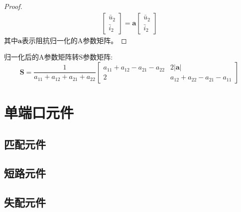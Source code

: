 \begin{tcbproof}
\begin{proof}
\begin{equation}
\begin{aligned}
                \begin{bmatrix}
                    \bar{u}_2\\
                    \bar{i}_2                
                \end{bmatrix}
                =\bm{a}
                \begin{bmatrix}
                    \bar{u}_2\\
                    \bar{i}_2                
                \end{bmatrix}
            \end{aligned}
        \end{equation}
        其中$\bm{a}$表示阻抗归一化的A参数矩阵。        
    \end{proof}\end{tcbproof}


    归一化后的A参数矩阵转S参数矩阵:
    \begin{equation}
        \bm{S}=\frac{1}{a_{11}+a_{12}+a_{21}+a_{22}}
        \begin{bmatrix}
            a_{11}+a_{12}-a_{21}-a_{22}&2|\bm{a}|\\
            2&a_{12}+a_{22}-a_{21}-a_{11}
        \end{bmatrix}
    \end{equation}

\section{单端口元件}
    \subsection{匹配元件}
    \subsection{短路元件}
    \subsection{失配元件}

